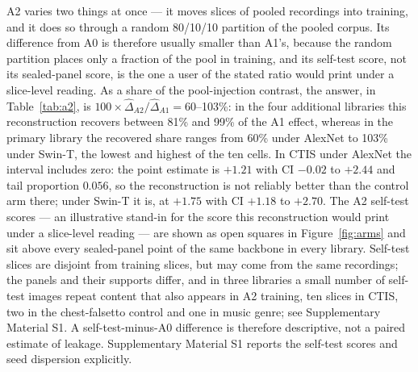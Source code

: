 A2 varies two things at once --- it moves slices of pooled recordings into training, and it does so
through a random 80/10/10 partition of the pooled corpus. Its difference from A0 is therefore
usually smaller than A1's, because the random partition places only a fraction of the pool in
training, and its self-test score, not its sealed-panel score, is the one a user of the stated ratio would
print under a slice-level reading. As a
share of the pool-injection contrast, the
answer, in Table~\ref{tab:a2}, is $100\times\hat\Delta_{A2}/\hat\Delta_{A1} = 60$--103\%: in the
four additional libraries this reconstruction recovers between 81\% and 99\% of the A1 effect,
whereas in the primary library the recovered share ranges from 60\% under AlexNet to 103\%
under Swin-T, the lowest and highest of the ten cells. In CTIS under AlexNet the interval
includes zero: the
point estimate is $+1.21$ with CI $-0.02$ to $+2.44$ and tail proportion $0.056$, so the
reconstruction is not reliably better than the control arm there; under Swin-T it is, at $+1.75$
with CI $+1.18$ to $+2.70$. The A2 self-test scores --- an illustrative stand-in for the score this reconstruction
would print under a slice-level reading --- are shown as open squares in Figure~\ref{fig:arms} and
sit above every sealed-panel point of the same backbone in every library. Self-test slices are
disjoint from training slices, but may come from
the same recordings; the panels and their supports differ, and in three libraries a small number of
self-test images repeat content that also appears in A2 training, ten slices in CTIS, two in the
chest-falsetto control and one in music genre; see Supplementary Material S1. A self-test-minus-A0 difference is
therefore descriptive, not a paired estimate of leakage. Supplementary Material S1 reports the
self-test scores and seed dispersion explicitly.

